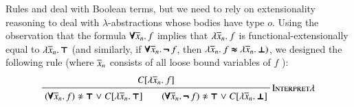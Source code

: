 
Rules  and  deal with Boolean terms,
but we need to rely on extensionality reasoning to deal with $\lambda$-abstractions
whose bodies have type $o$. Using the observation that the formula $\pmb{\forall} \overline{x}_{n}. \, f$ 
implies that $\lambda \overline{x}_{n}.\> f$ is functional-extensionally equal to $\lambda \overline{x}_{n}.\> \pmb{\top}$ (and similarly, if
$\pmb{\forall} \overline{x}_{n}. \, \pmb{\neg\,} f$, then $\lambda \overline{x}_{n}.\> f \pmb{\approx} \lambda \overline{x}_{n}.\> \pmb{\bot})$, we
designed the following rule (where $\overline{x}_{n}$ consists of all loose bound variables of $f$ ):
%
$$ \namedinference{Interpret$\lambda$}{C[\lam{\tuplen{x}}{f}]}
{(\iforall {\tuplen{x}}.\, f) \noteq \itrue \llor C[\lam{\tuplen{x}}{\itrue}] \qquad
(\iforall {\tuplen{x}}.\, \inot f) \noteq \itrue \llor C[\lam{\tuplen{x}}{\ifalse}]} $$
%

